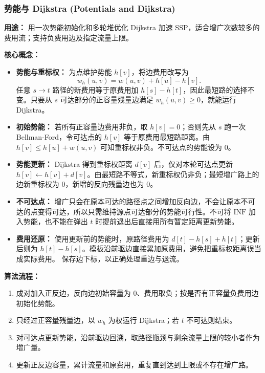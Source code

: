 

\subsubsection{势能与 Dijkstra (Potentials and Dijkstra)}

\textbf{用途：} 用一次势能初始化和多轮堆优化 Dijkstra 加速 SSP，适合增广次数较多的费用流；支持负费用边及指定流量上限。

\textbf{核心概念：}
\begin{itemize}
  \item \textbf{势能与重标权：} 为点维护势能 $h[v]$，将边费用改写为
  \[
    w_h(u,v)=w(u,v)+h[u]-h[v].
  \]
  任意 $s\to t$ 路径的新费用等于原费用加 $h[s]-h[t]$，因此最短路的选择不变。只要从 $s$ 可达部分的正容量残量边满足 $w_h(u,v)\ge 0$，就能运行 Dijkstra。
  \item \textbf{初始势能：} 若所有正容量边费用非负，取 $h[v]=0$；否则先从 $s$ 跑一次 Bellman-Ford，令可达点的 $h[v]$ 等于原费用最短路距离。由 $h[v]\le h[u]+w(u,v)$ 可知重标权非负。不可达点的势能设为 $0$。
  \item \textbf{势能更新：} Dijkstra 得到重标权距离 $d[v]$ 后，仅对本轮可达点更新 $h[v]\gets h[v]+d[v]$。由最短路不等式，新重标权仍非负；最短增广路上的边新重标权为 $0$，新增的反向残量边也为 $0$。
  \item \textbf{不可达点：} 增广只会在原本可达的路径点之间增加反向边，不会让原本不可达的点变得可达，所以只需维持源点可达部分的势能可行性。不可将 $\mathrm{INF}$ 加入势能，也不能在弹出 $t$ 时提前退出后直接用所有暂定距离更新势能。
  \item \textbf{费用还原：} 使用更新前的势能时，原路径费用为 $d[t]-h[s]+h[t]$；更新后则为 $h[t]-h[s]$。模板沿前驱边直接累加原费用，避免把重标权距离误当成实际费用。 保存边下标，以正确处理重边与退流。
\end{itemize}

\textbf{算法流程：}
\begin{enumerate}
  \item 成对加入正反边，反向边初始容量为 $0$、费用取负；按是否有正容量负费用边初始化势能。
  \item 只经过正容量残量边，以 $w_h$ 为权运行 Dijkstra；若 $t$ 不可达则结束。
  \item 对可达点更新势能，沿前驱边回溯，取路径瓶颈与剩余流量上限的较小者作为增广量。
  \item 更新正反边容量，累计流量和原费用，重复直到达到上限或不存在增广路。
\end{enumerate}

